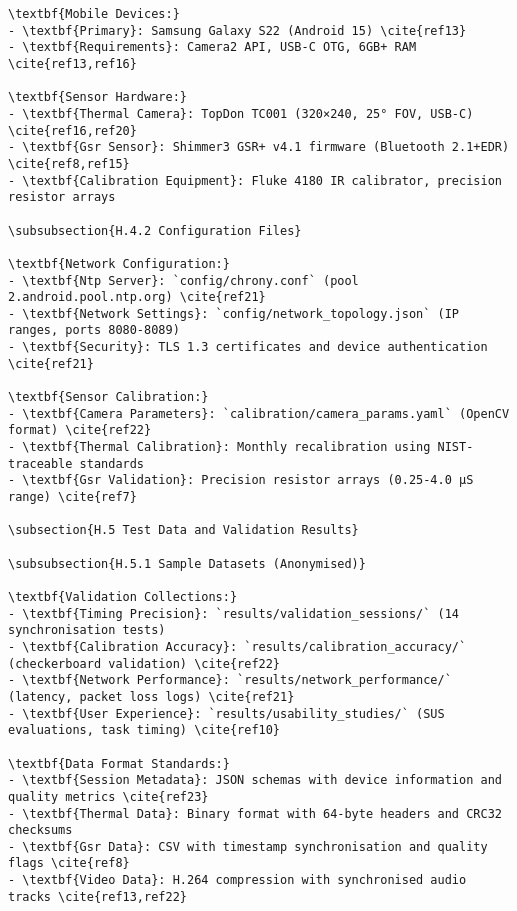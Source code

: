\begin{verbatim}
\textbf{Mobile Devices:}
- \textbf{Primary}: Samsung Galaxy S22 (Android 15) \cite{ref13}
- \textbf{Requirements}: Camera2 API, USB-C OTG, 6GB+ RAM \cite{ref13,ref16}

\textbf{Sensor Hardware:}
- \textbf{Thermal Camera}: TopDon TC001 (320×240, 25° FOV, USB-C) \cite{ref16,ref20}
- \textbf{Gsr Sensor}: Shimmer3 GSR+ v4.1 firmware (Bluetooth 2.1+EDR) \cite{ref8,ref15}
- \textbf{Calibration Equipment}: Fluke 4180 IR calibrator, precision resistor arrays

\subsubsection{H.4.2 Configuration Files}

\textbf{Network Configuration:}
- \textbf{Ntp Server}: `config/chrony.conf` (pool 2.android.pool.ntp.org) \cite{ref21}
- \textbf{Network Settings}: `config/network_topology.json` (IP ranges, ports 8080-8089)
- \textbf{Security}: TLS 1.3 certificates and device authentication \cite{ref21}

\textbf{Sensor Calibration:}
- \textbf{Camera Parameters}: `calibration/camera_params.yaml` (OpenCV format) \cite{ref22}
- \textbf{Thermal Calibration}: Monthly recalibration using NIST-traceable standards
- \textbf{Gsr Validation}: Precision resistor arrays (0.25-4.0 μS range) \cite{ref7}

\subsection{H.5 Test Data and Validation Results}

\subsubsection{H.5.1 Sample Datasets (Anonymised)}

\textbf{Validation Collections:}
- \textbf{Timing Precision}: `results/validation_sessions/` (14 synchronisation tests)
- \textbf{Calibration Accuracy}: `results/calibration_accuracy/` (checkerboard validation) \cite{ref22}
- \textbf{Network Performance}: `results/network_performance/` (latency, packet loss logs) \cite{ref21}
- \textbf{User Experience}: `results/usability_studies/` (SUS evaluations, task timing) \cite{ref10}

\textbf{Data Format Standards:}
- \textbf{Session Metadata}: JSON schemas with device information and quality metrics \cite{ref23}
- \textbf{Thermal Data}: Binary format with 64-byte headers and CRC32 checksums
- \textbf{Gsr Data}: CSV with timestamp synchronisation and quality flags \cite{ref8}
- \textbf{Video Data}: H.264 compression with synchronised audio tracks \cite{ref13,ref22}


\end{verbatim}
